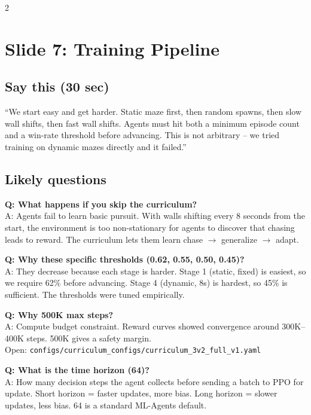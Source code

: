 \documentclass[9pt,a4paper]{article}
\begin{document}
\begin{multicols}{2}
\section{Slide 7: Training Pipeline}

\subsection{Say this (30 sec)}
``We start easy and get harder. Static maze first, then random spawns, then slow wall shifts, then fast wall shifts. Agents must hit both a minimum episode count and a win-rate threshold before advancing. This is not arbitrary -- we tried training on dynamic mazes directly and it failed.''

\subsection{Likely questions}
\textbf{Q: What happens if you skip the curriculum?} \\
A: Agents fail to learn basic pursuit. With walls shifting every 8 seconds from the start, the environment is too non-stationary for agents to discover that chasing leads to reward. The curriculum lets them learn chase $\rightarrow$ generalize $\rightarrow$ adapt.

\textbf{Q: Why these specific thresholds (0.62, 0.55, 0.50, 0.45)?} \\
A: They decrease because each stage is harder. Stage 1 (static, fixed) is easiest, so we require 62\% before advancing. Stage 4 (dynamic, 8s) is hardest, so 45\% is sufficient. The thresholds were tuned empirically.

\textbf{Q: Why 500K max steps?} \\
A: Compute budget constraint. Reward curves showed convergence around 300K--400K steps. 500K gives a safety margin. \\
{\scriptsize\color{gray} Open: \texttt{configs/curriculum\_configs/curriculum\_3v2\_full\_v1.yaml}}

\textbf{Q: What is the time horizon (64)?} \\
A: How many decision steps the agent collects before sending a batch to PPO for update. Short horizon = faster updates, more bias. Long horizon = slower updates, less bias. 64 is a standard ML-Agents default.


\end{multicols}
\end{document}
